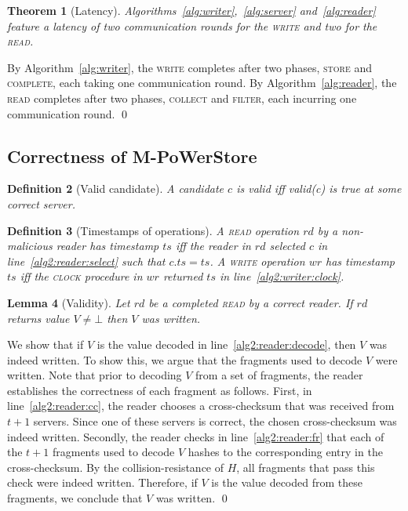 \documentclass[10pt,conference,compsocconf]{IEEEtran}
\newcommand{\mprotocol}{M-PoWerStore}
\newcommand{\complete}{\textsc{complete}}
\newtheorem{defn}{Definition}[section]
\newtheorem{la}[defn]{Lemma}
\newtheorem{theo}[defn]{Theorem}
\newenvironment{prooff}{\vspace{1ex}\noindent{\bf Proof:}\hspace{0.5em}}
	{\hfill\qed\vspace{1em}}
\begin{document}
\begin{theo}[Latency]
Algorithms~\ref{alg:writer},~\ref{alg:server} and~\ref{alg:reader} feature a latency of \emph{two} communication rounds for the \textsc{write} and \emph{two} for the \textsc{read}.
\end{theo}
\begin{prooff} By Algorithm~\ref{alg:writer}, the \textsc{write} completes after two phases, \textsc{store} and \textsc{\complete}, each taking one communication round. By Algorithm~\ref{alg:reader}, the \textsc{read} completes after two phases, \textsc{collect} and \textsc{filter}, each incurring one communication round.
\end{prooff}

\subsection{Correctness of \mprotocol}

\begin{defn}[Valid candidate] \label{def2:validcand}
A candidate $c$ is \emph{valid} iff \emph{\textsf{valid}(c)} is true at some correct server.
\end{defn}

\begin{defn}[Timestamps of operations]
A \textsc{read} operation $rd$ by a non-malicious reader has timestamp $ts$ iff the reader in $rd$ selected $c$
in line~\ref{alg2:reader:select} such that $c.ts = ts$. A \textsc{write} operation $wr$ has timestamp $ts$ iff the \textsc{clock} procedure in $wr$ returned $ts$ in line~\ref{alg2:writer:clock}.
\end{defn}

\begin{la}[Validity]\label{la2:validity}
Let $rd$ be a completed \textsc{read} by a correct reader. If $rd$ returns value $V \neq \bot$ then $V$ was written.
\end{la}
\begin{prooff} We show that if $V$ is the value decoded in line~\ref{alg2:reader:decode}, then $V$ was indeed written. To show this, we argue that the fragments used to decode $V$ were written. Note that prior to decoding $V$ from a set of fragments, the reader establishes the correctness of each fragment as follows. First, in line~\ref{alg2:reader:cc}, the reader chooses a cross-checksum that was received from $t+1$ servers. Since one of these servers is correct, the chosen cross-checksum was indeed written. Secondly, the reader checks in line~\ref{alg2:reader:fr} that each of the $t+1$ fragments used to decode $V$ hashes to the corresponding entry in the cross-checksum.  By the collision-resistance of $H$, all fragments that pass this check were indeed written. Therefore, if $V$ is the value decoded from these fragments, we conclude that $V$ was written.
\end{prooff}
\end{document}
